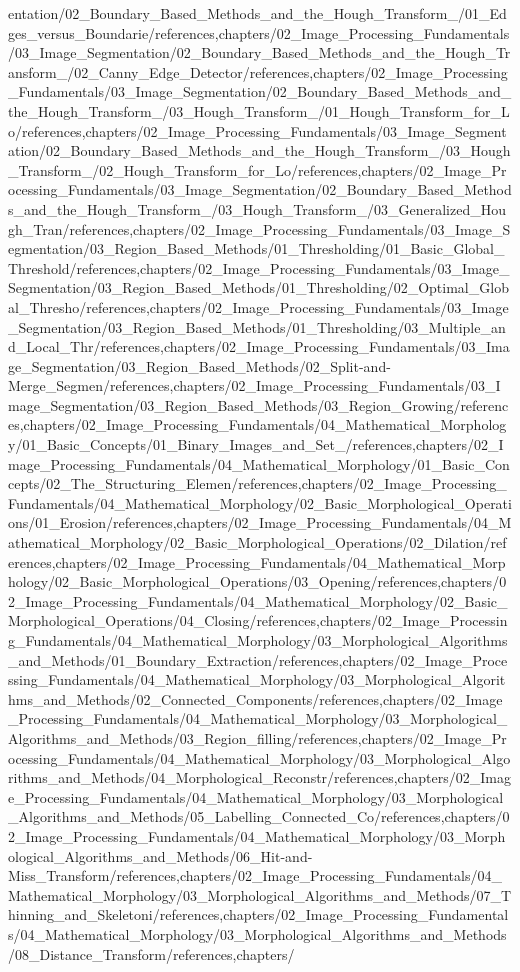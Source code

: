 entation/02_Boundary_Based_Methods_and_the_Hough_Transform_/01_Edges_versus_Boundarie/references,chapters/02_Image_Processing_Fundamentals/03_Image_Segmentation/02_Boundary_Based_Methods_and_the_Hough_Transform_/02_Canny_Edge_Detector/references,chapters/02_Image_Processing_Fundamentals/03_Image_Segmentation/02_Boundary_Based_Methods_and_the_Hough_Transform_/03_Hough_Transform_/01_Hough_Transform_for_Lo/references,chapters/02_Image_Processing_Fundamentals/03_Image_Segmentation/02_Boundary_Based_Methods_and_the_Hough_Transform_/03_Hough_Transform_/02_Hough_Transform_for_Lo/references,chapters/02_Image_Processing_Fundamentals/03_Image_Segmentation/02_Boundary_Based_Methods_and_the_Hough_Transform_/03_Hough_Transform_/03_Generalized_Hough_Tran/references,chapters/02_Image_Processing_Fundamentals/03_Image_Segmentation/03_Region_Based_Methods/01_Thresholding/01_Basic_Global_Threshold/references,chapters/02_Image_Processing_Fundamentals/03_Image_Segmentation/03_Region_Based_Methods/01_Thresholding/02_Optimal_Global_Thresho/references,chapters/02_Image_Processing_Fundamentals/03_Image_Segmentation/03_Region_Based_Methods/01_Thresholding/03_Multiple_and_Local_Thr/references,chapters/02_Image_Processing_Fundamentals/03_Image_Segmentation/03_Region_Based_Methods/02_Split-and-Merge_Segmen/references,chapters/02_Image_Processing_Fundamentals/03_Image_Segmentation/03_Region_Based_Methods/03_Region_Growing/references,chapters/02_Image_Processing_Fundamentals/04_Mathematical_Morphology/01_Basic_Concepts/01_Binary_Images_and_Set_/references,chapters/02_Image_Processing_Fundamentals/04_Mathematical_Morphology/01_Basic_Concepts/02_The_Structuring_Elemen/references,chapters/02_Image_Processing_Fundamentals/04_Mathematical_Morphology/02_Basic_Morphological_Operations/01_Erosion/references,chapters/02_Image_Processing_Fundamentals/04_Mathematical_Morphology/02_Basic_Morphological_Operations/02_Dilation/references,chapters/02_Image_Processing_Fundamentals/04_Mathematical_Morphology/02_Basic_Morphological_Operations/03_Opening/references,chapters/02_Image_Processing_Fundamentals/04_Mathematical_Morphology/02_Basic_Morphological_Operations/04_Closing/references,chapters/02_Image_Processing_Fundamentals/04_Mathematical_Morphology/03_Morphological_Algorithms_and_Methods/01_Boundary_Extraction/references,chapters/02_Image_Processing_Fundamentals/04_Mathematical_Morphology/03_Morphological_Algorithms_and_Methods/02_Connected_Components/references,chapters/02_Image_Processing_Fundamentals/04_Mathematical_Morphology/03_Morphological_Algorithms_and_Methods/03_Region_filling/references,chapters/02_Image_Processing_Fundamentals/04_Mathematical_Morphology/03_Morphological_Algorithms_and_Methods/04_Morphological_Reconstr/references,chapters/02_Image_Processing_Fundamentals/04_Mathematical_Morphology/03_Morphological_Algorithms_and_Methods/05_Labelling_Connected_Co/references,chapters/02_Image_Processing_Fundamentals/04_Mathematical_Morphology/03_Morphological_Algorithms_and_Methods/06_Hit-and-Miss_Transform/references,chapters/02_Image_Processing_Fundamentals/04_Mathematical_Morphology/03_Morphological_Algorithms_and_Methods/07_Thinning_and_Skeletoni/references,chapters/02_Image_Processing_Fundamentals/04_Mathematical_Morphology/03_Morphological_Algorithms_and_Methods/08_Distance_Transform/references,chapters/